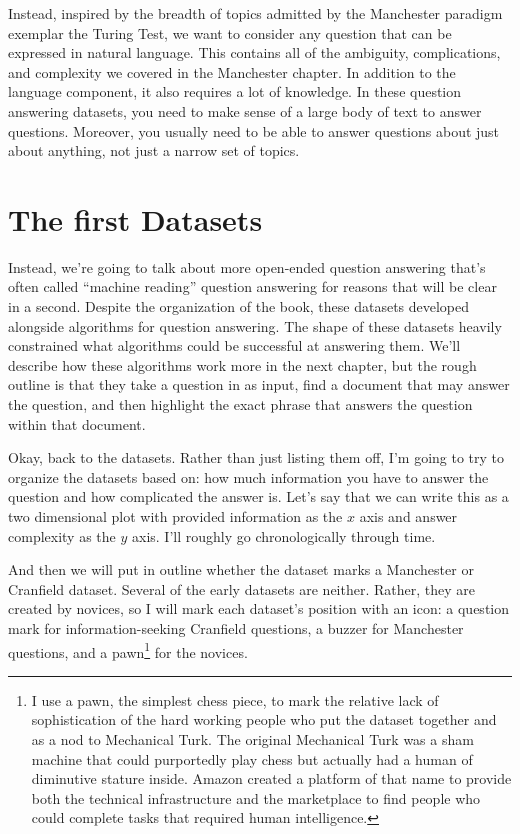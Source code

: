 Instead, inspired by the breadth of topics admitted by the Manchester
paradigm exemplar the Turing Test, we want to consider any question
that can be expressed in natural language.
%
This contains all of the ambiguity, complications, and complexity we
covered in the Manchester chapter.
%
In addition to the language component, it also requires a lot of
knowledge.
%
In these question answering datasets, you need to make sense of a
large body of text to answer questions.  Moreover, you usually need to
be able to answer questions about just about anything, not just a
narrow set of topics.

\section{The first  Datasets}
\label{sec:datasets:first}

Instead, we're going to talk about more open-ended question answering
that’s often called ``machine reading'' question answering for reasons
that will be clear in a second.
%
Despite the organization of the book, these datasets developed
alongside algorithms for question answering.
%
The shape of these datasets heavily constrained what algorithms could
be successful at answering them.
%
We'll describe how these algorithms work more in the next chapter, but
the rough outline is that they take a question in as input, find a
document that may answer the question, and then highlight the exact
phrase that answers the question within that document.

Okay, back to the datasets.  Rather than just listing them off, I’m
going to try to organize the datasets based on: how much information
you have to answer the question and how complicated the answer is.
Let’s say that we can write this as a two dimensional plot with
provided information as the $x$ axis and answer complexity as the $y$
axis.  I’ll roughly go chronologically through time.

And then we will put in outline whether the dataset marks a Manchester
or Cranfield dataset.  Several of the early datasets are neither.
Rather, they are created by novices, so I will mark each dataset's
position with an icon: a question mark for information-seeking
Cranfield questions, a buzzer for Manchester questions, and a
pawn\footnote{I use a pawn, the simplest chess piece, to mark the
relative lack of sophistication of the hard working people who put the
dataset together and as a nod to Mechanical Turk.  The original
Mechanical Turk was a sham machine that could purportedly play chess
but actually had a human of diminutive stature inside.  Amazon created
a platform of that name to provide both the technical infrastructure
and the marketplace to find people who could complete tasks that
    required human intelligence. } for the novices.


